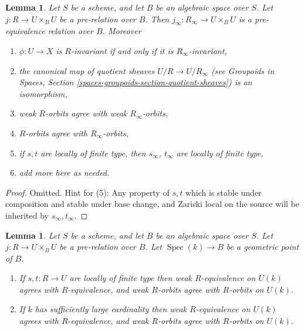 \documentclass{stacks-project}
\theoremstyle{plain}
\newtheorem{lemma}[subsection]{Lemma}
\theoremstyle{definition}
\theoremstyle{remark}
\numberwithin{equation}{subsection}
\def\Spec{\mathop{\mathrm{Spec}}}
\begin{document}
\begin{lemma}
\label{lemma-make-pre-equivalence}
Let $S$ be a scheme, and let $B$ be an algebraic space over $S$.
Let $j : R \to U \times_B U$ be a pre-relation over $B$.
Then $j_\infty : R_\infty \to U \times_B U$ is a
pre-equivalence relation over $B$. Moreover
\begin{enumerate}
\item $\phi : U \to X$ is $R$-invariant if and only if it is
$R_\infty$-invariant,
\item the canonical map of quotient sheaves $U/R \to U/R_\infty$ (see
Groupoids in Spaces, Section \ref{spaces-groupoids-section-quotient-sheaves})
is an isomorphism,
\item weak $R$-orbits agree with weak $R_\infty$-orbits,
\item $R$-orbits agree with $R_\infty$-orbits,
\item if $s, t$ are locally of finite type, then $s_\infty$, $t_\infty$
are locally of finite type,
\item add more here as needed.
\end{enumerate}
\end{lemma}

\begin{proof}
Omitted. Hint for (5): Any property of $s, t$ which is stable under composition
and stable under base change, and Zariski local on the source
will be inherited by $s_\infty, t_\infty$.
\end{proof}

\begin{lemma}
\label{lemma-geometric-orbits}
Let $S$ be a scheme, and let $B$ be an algebraic space over $S$.
Let $j : R \to U \times_B U$ be a pre-relation over $B$.
Let $\Spec(k) \to B$ be a geometric point of $B$.
\begin{enumerate}
\item If $s, t : R \to U$ are locally of finite type
then weak $R$-equivalence on $U(k)$ agrees with $R$-equivalence, and
weak $R$-orbits agree with $R$-orbits on $U(k)$.
\item If $k$ has sufficiently large cardinality then weak $R$-equivalence
on $U(k)$ agrees with $R$-equivalence, and weak $R$-orbits agree
with $R$-orbits on $U(k)$.
\end{enumerate}
\end{lemma}
\end{document}
